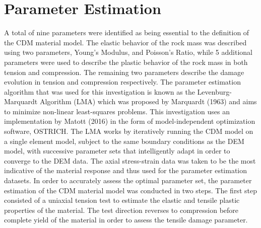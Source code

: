 \section{Parameter Estimation}
A total of nine parameters were identified as being essential to the definition of the CDM material model. The elastic behavior of the rock mass was described using two parameters, Young’s Modulus, and Poisson’s Ratio, while 5 additional parameters were used to describe the plastic behavior of the rock mass in both tension and compression. The remaining two parameters describe the damage evolution in tension and compression respectively. 
The parameter estimation algorithm that was used for this investigation is known as the Levenburg-Marquardt Algorithm (LMA) which was proposed by Marquardt (1963) and aims to minimize non-linear least-squares problems. This investigation uses an implementation by Matott (2016) in the form of model-independent optimization software, OSTRICH.
The LMA works by iteratively running the CDM model on a single element model, subject to the same boundary conditions as the DEM model, with successive parameter sets that intelligently adapt in order to converge to the DEM data. The axial stress-strain data was taken to be the most indicative of the material response and thus used for the parameter estimation datasets.
In order to accurately assess the optimal parameter set, the parameter estimation of the CDM material model was conducted in two steps. The first step consisted of a uniaxial tension test to estimate the elastic and tensile plastic properties of the material. The test direction reverses to compression before complete yield of the material in order to assess the tensile damage parameter. 

